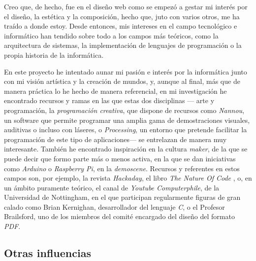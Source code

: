 \documentclass[twoside]{article}
\begin{document}
\begin{multicols}{2}
    Creo que, de hecho, fue en el diseño web como se empezó a gestar mi interés por el diseño, 
    la estética y la composición, hecho que, juto con varios otros, me ha traído a donde 
    estoy. Desde entonces, mis intereses en el campo tecnológico e informático han tendido 
    sobre todo a los campos más teóricos, como la arquitectura de sistemas, la implementación 
    de lenguajes de programación o la propia historia de la informática.
    
    En este proyecto he intentado aunar mi pasión e interés por la informática junto con mi 
    visión artística y la creación de mundos, y, aunque al final, más que de manera práctica 
    lo he hecho de manera referencial, en mi investigación he encontrado recursos y ramas en 
    las que estas dos disciplinas --- arte y programación, la \emph{programación creativa}, 
    que dispone de recursos como \emph{Nannou}\autocite*{nannou}, un software que permite 
    programar una amplia gama de demostraciones visuales, auditivas o incluso con láseres, o 
    \emph{Processing}\autocite*{processing}, un entorno que pretende facilitar la programación 
    de este tipo de aplicaciones--- se entrelazan de manera muy interesante. También he 
    encontrado inspiración en la cultura \emph{maker}, de la que se puede decir que formo 
    parte más o menos activa, en la que se dan iniciativas como \emph{Arduino}\autocite*
    {arduino} o \emph{Raspberry Pi}\autocite*{raspberry}, en la \emph{demoscene}\autocite*
    {demoscene}. Recursos y referentes en estos campos son, por ejemplo, la revista \emph
    {Hackaday}\autocite*{hackaday}, el libro \emph{The Nature Of Code}\autocite*{shiffman2012}
    , o, en un ámbito puramente teórico, el canal de \emph{Youtube Computerphile}, de la Universidad de Nottingham, en el que participan regularmente 
    figuras de gran calado como Brian Kernighan, desarrollador del lenguaje \emph{C}\autocite*
  {cprogramming}, o el Profesor Brailsford, uno de los miembros del comité encargado del 
  diseño del formato \emph{PDF}.
  
  \hypertarget{otras-influencias}{%
  \subsection{Otras influencias}\label{otras-influencias}}
  

\end{multicols}
\end{document}
